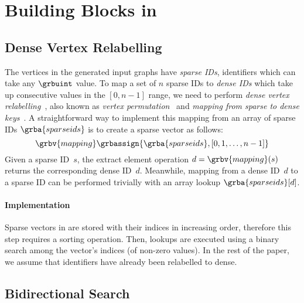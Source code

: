 \section{Building Blocks in \grb}
\label{sec:building-blocks}



\subsection{Dense Vertex Relabelling}

The vertices in the generated input graphs have \emph{sparse IDs}, \ie identifiers which can take any $\grbuint$ value. To map a set of $n$ sparse IDs to \emph{dense IDs} which take up consecutive values in the $[0, n-1]$ range, we need to perform \emph{dense vertex relabelling}~\cite{DBLP:conf/grades/ThenKK016}, also known as \emph{vertex permutation}~\cite{DBLP:journals/corr/abs-1806-01799} and \emph{mapping from sparse to dense keys}~\cite{DBLP:journals/pvldb/MuhlbauerRSRK013}.
A straightforward way to implement this mapping from an array of sparse IDs $\grba{sparseids}$
is to create a sparse vector as follows:
$$
\grbv{mapping} \grbassign \{ \grba{sparseids}, [0, 1, \ldots, n-1] \}
$$
Given a sparse ID~$s$, the \grb extract element operation $d = \grbv{mapping}(s)$ returns the corresponding dense ID~$d$.
Meanwhile, mapping from a dense ID~$d$ to a sparse ID can be performed trivially with an array lookup $\grba{sparseids}[d]$.

\paragraph{Implementation}
Sparse vectors in \gxb are stored with their indices in increasing order, therefore this step requires a sorting operation.
Then, lookups are executed using a binary search among the vector's indices (of non-zero values).
In the rest of the paper, we assume that identifiers have already been relabelled to dense.




\subsection{Bidirectional Search}

